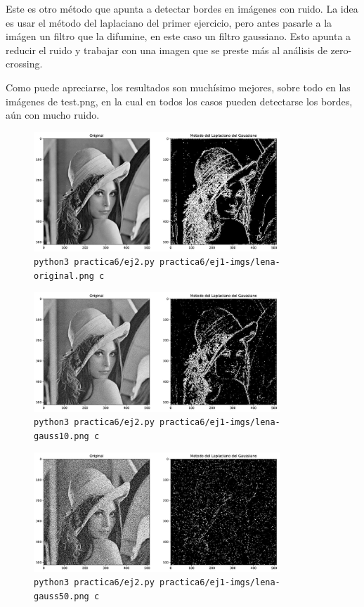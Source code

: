 \documentclass[11pt, spanish]{article}
\begin{document}
Este es otro método que apunta a detectar bordes en imágenes con ruido. La idea es usar el método del laplaciano del primer ejercicio, pero antes pasarle a la imágen un filtro que la difumine, en este caso un filtro gaussiano.
Esto apunta a reducir el ruido y trabajar con una imagen que se preste más al análisis de zero-crossing.

Como puede apreciarse, los resultados son muchísimo mejores, sobre todo en las imágenes de test.png, en la cual en todos los casos pueden detectarse los bordes, aún con mucho ruido.

\begin{figure}[H]
\centering
    \includegraphics[height=4.5cm]{informe-imgs/ej2-c-lena-original.jpg}
    \caption{\texttt{python3 practica6/ej2.py practica6/ej1-imgs/lena-original.png c}}
\end{figure}

\begin{figure}[H]
\centering
    \includegraphics[height=4.5cm]{informe-imgs/ej2-c-lena-gauss10.jpg}
    \caption{\texttt{python3 practica6/ej2.py practica6/ej1-imgs/lena-gauss10.png c}}
\end{figure}

\begin{figure}[H]
\centering
    \includegraphics[height=4.5cm]{informe-imgs/ej2-c-lena-gauss50.jpg}
    \caption{\texttt{python3 practica6/ej2.py practica6/ej1-imgs/lena-gauss50.png c}}
\end{figure}
\end{document}
